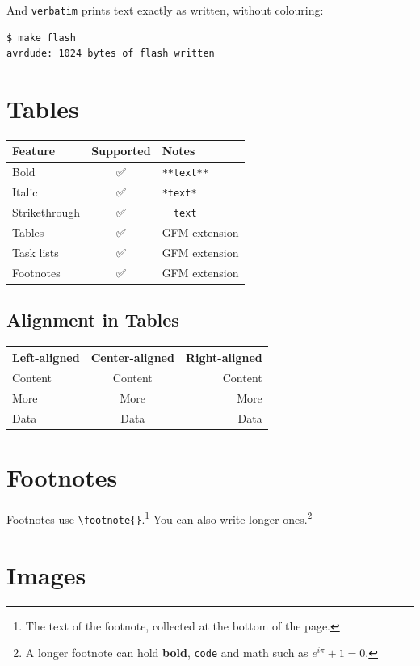 And \texttt{verbatim} prints text exactly as written, without colouring:

\begin{verbatim}
$ make flash
avrdude: 1024 bytes of flash written
\end{verbatim}

\section{Tables}

\begin{tabular}{lcl}
\hline
Feature & Supported & Notes \\
\hline
Bold & ✅ & \texttt{**text**} \\
Italic & ✅ & \texttt{*text*} \\
Strikethrough & ✅ & \texttt{~~text~~} \\
Tables & ✅ & GFM extension \\
Task lists & ✅ & GFM extension \\
Footnotes & ✅ & GFM extension \\
\hline
\end{tabular}

\subsection{Alignment in Tables}

\begin{tabular}{lcr}
\hline
Left-aligned & Center-aligned & Right-aligned \\
\hline
Content & Content & Content \\
More & More & More \\
Data & Data & Data \\
\hline
\end{tabular}

\section{Footnotes}

Footnotes use \texttt{\textbackslash{}footnote\{\}}.\footnote{The text of the footnote, collected at the bottom of the page.} You can also write longer ones.\footnote{A longer footnote can hold \textbf{bold}, \texttt{code} and math such as $e^{i\pi} + 1 = 0$.}

\section{Images}

